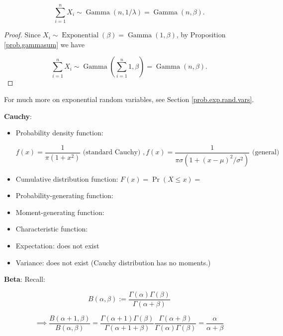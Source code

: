 \begin{itemize}
\begin{corollary}
\[
\sum_{i=1}^n X_i \sim \operatorname{Gamma} \left(  n, 1/\lambda \right) = \operatorname{Gamma} \left(  n, \beta \right).
\]

\end{corollary}

\begin{proof}

Since \(X_i \sim \operatorname{Exponential}(\beta) = \operatorname{Gamma}(1, \beta)\), by Proposition \ref{prob.gammasum} we have

\[
\sum_{i=1}^n X_i \sim \operatorname{Gamma} \left( \sum_{i=1}^n 1, \beta \right) =  \operatorname{Gamma} \left( n, \beta \right).
\] 

\end{proof}

For much more on exponential random variables, see Section \ref{prob.exp.rand.vars}.

\textbf{Cauchy}: 

\begin{itemize}

\item Probability density function: 

\[
f(x) = \frac{1}{\pi(1 + x^2)} \text{ (standard Cauchy) }, f(x) = \frac{1}{\pi \sigma (1 + (x - \mu)^2/\sigma^2)}  \text{ (general)}
\]

\item Cumulative distribution function: \(F(x) = \Pr(X \leq x) = \)

\item Probability-generating function:

\item Moment-generating function:

\item Characteristic function:

\item Expectation: does not exist

\item Variance: does not exist (Cauchy distribution has no moments.)

\end{itemize}

\textbf{Beta}: Recall:

\[
B(\alpha, \beta) := \frac{\Gamma(\alpha) \Gamma(\beta)}{\Gamma(\alpha + \beta)}
\]

\[
\implies \frac{B(\alpha + 1, \beta)}{B(\alpha, \beta)} = \frac{\Gamma(\alpha + 1) \Gamma(\beta)}{\Gamma(\alpha + 1 + \beta)} \frac{\Gamma(\alpha + \beta)}{\Gamma(\alpha)\Gamma(\beta)} = \frac{\alpha}{\alpha + \beta}
\]


\end{itemize}
